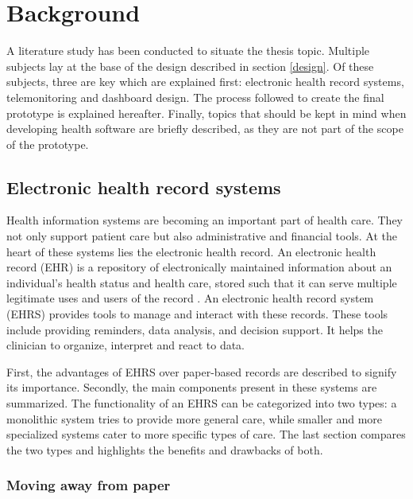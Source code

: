 \section{Background} \label{background}

A literature study has been conducted to situate the thesis topic. Multiple subjects lay at the base of the design described in section \ref{design}. Of these subjects, three are key which are explained first: electronic health record systems, telemonitoring and dashboard design. The process followed to create the final prototype is explained hereafter. Finally, topics that should be kept in mind when developing health software are briefly described, as they are not part of the scope of the prototype.

    \subsection{Electronic health record systems}

    Health information systems are becoming an important part of health care. They not only support patient care but also administrative and financial tools. At the heart of these systems lies the electronic health record. An electronic health record (EHR) is a repository of electronically maintained information about an individual's health status and health care, stored such that it can serve multiple legitimate uses and users of the record \cite{biomedical_informatics}. An electronic health record system (EHRS) provides tools to manage and interact with these records. These tools include providing reminders, data analysis, and decision support. It helps the clinician to organize, interpret and react to data.

    First, the advantages of EHRS over paper-based records are described to signify its importance. Secondly, the main components present in these systems are summarized. The functionality of an EHRS can be categorized into two types: a monolithic system tries to provide more general care, while smaller and more specialized systems cater to more specific types of care. The last section compares the two types and highlights the benefits and drawbacks of both.

        \subsubsection{Moving away from paper} \label{2_ehrs_paper}

